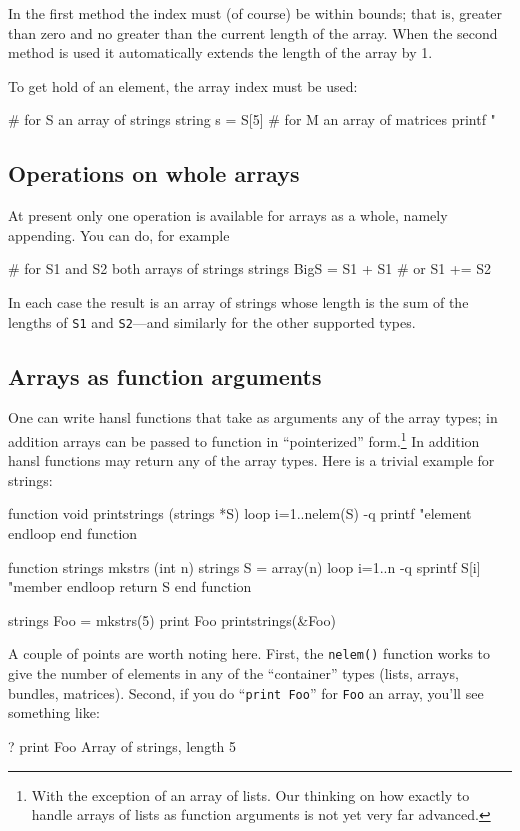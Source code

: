 In the first method the index must (of course) be within bounds; that
is, greater than zero and no greater than the current length of the
array. When the second method is used it automatically extends the
length of the array by 1.

To get hold of an element, the array index must be used:
\begin{code}
# for S an array of strings
string s = S[5]
# for M an array of matrices
printf "\n%
\end{code}

\subsection{Operations on whole arrays}

At present only one operation is available for arrays as a whole,
namely appending. You can do, for example
\begin{code}
# for S1 and S2 both arrays of strings
strings BigS = S1 + S1
# or
S1 += S2
\end{code}
In each case the result is an array of strings whose length is the sum
of the lengths of \texttt{S1} and \texttt{S2}---and similarly for the
other supported types.

\subsection{Arrays as function arguments}
\label{subsec:array-args}

One can write hansl functions that take as arguments any of the array
types; in addition arrays can be passed to function in ``pointerized''
form.\footnote{With the exception of an array of lists. Our thinking
  on how exactly to handle arrays of lists as function arguments is
  not yet very far advanced.} In addition hansl functions may return
any of the array types. Here is a trivial example for strings:
\begin{code}
function void printstrings (strings *S)
  loop i=1..nelem(S) -q
    printf "element %
  endloop
end function

function strings mkstrs (int n)
  strings S = array(n)
  loop i=1..n -q
    sprintf S[i] "member %
  endloop
  return S
end function

strings Foo = mkstrs(5)
print Foo
printstrings(&Foo)
\end{code}

A couple of points are worth noting here. First, the \texttt{nelem()}
function works to give the number of elements in any of the
``container'' types (lists, arrays, bundles, matrices). Second, if you
do ``\texttt{print Foo}'' for \texttt{Foo} an array, you'll see
something like:
\begin{code}
? print Foo
Array of strings, length 5
\end{code}

